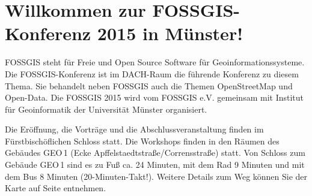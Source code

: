 \newpage
\section*{Willkommen zur FOSSGIS-Konferenz 2015 in Münster!} \label{welcome}
FOSSGIS steht für Freie und Open Source Software für Geoinformationssysteme. 
Die FOSSGIS-Konferenz ist im DACH-Raum die führende Konferenz zu diesem Thema. Sie behandelt neben
FOSSGIS auch die Themen OpenStreetMap und Open-Data.
Die FOSSGIS 2015 wird vom FOSSGIS e.V. gemeinsam mit Institut für Geoinformatik der 
Universität Münster organisiert.

Die Eröffnung, die Vorträge und die Abschlussveranstaltung finden im Fürstbischöflichen Schloss statt. 
Die Workshops finden in den Räumen des Gebäudes GEO\,1 (Ecke Apffelstaedtstraße/Corrensstraße) statt. Von Schloss 
zum Gebäude GEO\,1 sind es zu Fuß ca. 24 Minuten, mit dem Rad 9 Minuten und mit dem Bus 8 Minuten (20-Minuten-Takt!).
Weitere Details zum Weg können Sie der Karte auf Seite \pageref{karte} entnehmen.

\newpage
